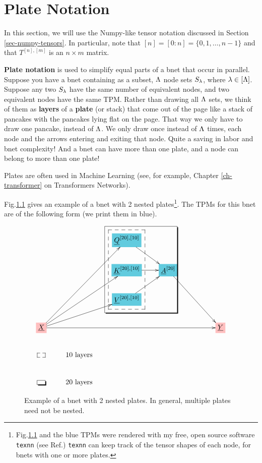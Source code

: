 \chapter{Plate Notation}
\label{ch-plates}

In this section, we 
will use the Numpy-like tensor notation
discussed in Section 
\ref{sec-numpy-tensors}. In particular, note that $[n] = [0:n] = \{0, 1,\ldots, n-1\}$ and that $T^{[n], [m]}$ is an $n\times m$ matrix.

{\bf Plate notation} is used to simplify 
equal parts of a bnet that occur in parallel.
Suppose you have a bnet containing as a subset, $\Lambda$ node sets $S_\lambda$, where
$\lambda\in [\Lambda]$. Suppose
any two $S_\lambda$ have the same number of equivalent nodes,
and two equivalent nodes have the same TPM.
Rather than drawing all $\Lambda$ sets, 
we think of them as {\bf layers} of a {\bf plate} (or stack)
that come out of the page like a stack of pancakes with the pancakes
lying flat on the page.
That way we only have to draw one pancake, instead of $\Lambda$.
We only draw once instead of $\Lambda$ times, each node and the arrows entering and exiting
that node. Quite a saving in labor and bnet complexity! 
And a bnet can have more 
than one plate, and a node can belong
to more than one plate!

Plates are often used in Machine Learning (see, for example,
Chapter \ref{ch-transformer} on Transformers Networks).

Fig.\ref{fig-texnn-for-rock_layers}
gives an example of a bnet with 2 nested plates\footnote{Fig.\ref{fig-texnn-for-rock_layers}
and the blue TPMs were
rendered with my free, open source software 
{\tt texnn} (see Ref.\cite{texnn})
{\tt texnn} 
can keep track of 
the tensor shapes
of each node, for bnets with one or more plates.
}. 
The TPMs for this bnet are of the following
form (we print them in blue).

\begin{figure}[h!]\centering
$$\xymatrix{
&&*+[F*:SkyBlue]{\underline{Q}^{[20],[10]}}\ar[dr]&&&
\\
&&*+[F*:SkyBlue]{\underline{K}^{[20],[10]}}\ar[r]&*+[F*:SkyBlue]{\underline{A}^{[20]}}\ar[ddrr]&&
\\
&&*+[F*:SkyBlue]{\underline{V}^{[20],[10]}}\ar[ur]&&&
\\
*+[F*:pink]{\underline{X}}\ar[uurr]\ar[uuurr]\ar[urr]\ar[rrrrr]&&&&&*+[F*:pink]{\underline{Y}}
\save
\POS"1,3"."3,3"."1,3"."3,3"!C*+<1.0em>\frm{--}
\POS"1,3"."3,3"."1,4"."3,4"!C*+<2.0em>\frm{-,}
\restore
\\
*+[F--]{\;\;}&\text{$10$ layers}
\\
*+[F-,]{\;\;}&\text{$20$ layers}
}$$
\caption{Example of a bnet with 2 nested plates.  In general, multiple plates need not be 
nested.}
\label{fig-texnn-for-rock_layers}
\end{figure}

